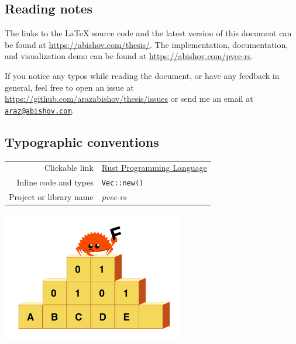 \vspace*{2cm}
\thispagestyle{plain}

\begin{center}

    \section*{\hfil Reading notes \hfil}
    \begin{justify}
        The links to the LaTeX source code and the latest version of this document can be found at \url{https://abishov.com/thesis/}. The implementation, documentation, and visualization demo can be found at \url{https://abishov.com/pvec-rs}.

        If you notice any typos while reading the document, or have any feedback in general, feel free to open an issue at \url{https://github.com/arazabishov/thesis/issues} or send me an email at \href{mailto:araz@abishov.com}{\nolinkurl{araz@abishov.com}}.
    \end{justify}

    \subsection*{\hfil Typographic conventions \hfil}
    \begin{tabular}{ r l }
        Clickable link & \href{https://www.rust-lang.org/}{Rust Programming Language} \\
        Inline code and types & \texttt{Vec::new()} \\
        Project or library name & \emph{pvec-rs} \\
    \end{tabular}

    \vspace*{1cm}
    \includegraphics[width=8cm, angle=0, trim=10 10 10 10, clip]{images/ferris-climbing.png}
\end{center}

